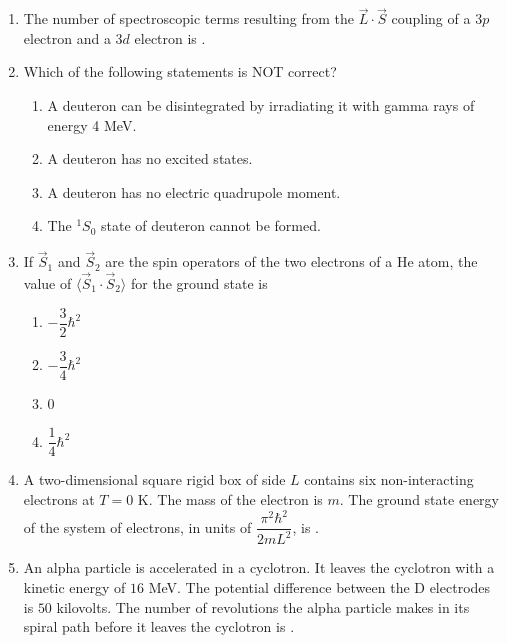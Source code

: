 \documentclass[journal,12pt,onecolumn]{IEEEtran}
\theoremstyle{remark}
\begin{document}
\begin{enumerate}
\item The number of spectroscopic terms resulting from the $\vec{L} \cdot \vec{S}$ coupling of a $3p$ electron and a $3d$ electron is \underline{\hspace{2cm}}.

\item Which of the following statements is NOT correct?

\begin{enumerate}
    \item A deuteron can be disintegrated by irradiating it with gamma rays of energy 4 MeV.
    \item A deuteron has no excited states.
    \item A deuteron has no electric quadrupole moment.
    \item The $^1S_0$ state of deuteron cannot be formed.
\end{enumerate}

\item If $\vec{S}_1$ and $\vec{S}_2$ are the spin operators of the two electrons of a He atom, the value of $\langle \vec{S}_1 \cdot \vec{S}_2 \rangle$ for the ground state is

\begin{multicols}{4}
\begin{enumerate}
    \item $-\dfrac{3}{2}\hbar^2$
    \item $-\dfrac{3}{4}\hbar^2$
    \item $0$
    \item $\dfrac{1}{4}\hbar^2$
\end{enumerate}
\end{multicols}

\item A two-dimensional square rigid box of side $L$ contains six non-interacting electrons at $T=0$ K. The mass of the electron is $m$. The ground state energy of the system of electrons, in units of $\dfrac{\pi^2\hbar^2}{2mL^2}$, is \underline{\hspace{2cm}}.

\item An alpha particle is accelerated in a cyclotron. It leaves the cyclotron with a kinetic energy of $16$ MeV. The potential difference between the D electrodes is $50$ kilovolts. The number of revolutions the alpha particle makes in its spiral path before it leaves the cyclotron is \underline{\hspace{2cm}}.



\end{enumerate}
\end{document}
